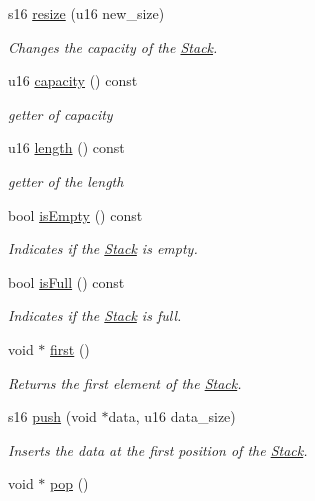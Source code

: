 \begin{DoxyCompactItemize}
s16 \hyperlink{class_stack_ae210ae6778f978313659fbd7aa59fc6c}{resize} (u16 new\+\_\+size)
\begin{DoxyCompactList}\small\item\em Changes the capacity of the \hyperlink{class_stack}{Stack}. \end{DoxyCompactList}\item 
u16 \hyperlink{class_stack_a3bb579836ffee2ddc1eb7cb0bfa02b43}{capacity} () const
\begin{DoxyCompactList}\small\item\em getter of capacity \end{DoxyCompactList}\item 
u16 \hyperlink{class_stack_af1b623c6719cf5d7ef22a73117fcd88f}{length} () const
\begin{DoxyCompactList}\small\item\em getter of the length \end{DoxyCompactList}\item 
bool \hyperlink{class_stack_a8b137edba711ed0250dccf9ecdd52971}{is\+Empty} () const
\begin{DoxyCompactList}\small\item\em Indicates if the \hyperlink{class_stack}{Stack} is empty. \end{DoxyCompactList}\item 
bool \hyperlink{class_stack_a1b7baacfc1eabbb0554852a4ea02618d}{is\+Full} () const
\begin{DoxyCompactList}\small\item\em Indicates if the \hyperlink{class_stack}{Stack} is full. \end{DoxyCompactList}\item 
void $\ast$ \hyperlink{class_stack_a32a58607561bad2f48e3af293027412c}{first} ()
\begin{DoxyCompactList}\small\item\em Returns the first element of the \hyperlink{class_stack}{Stack}. \end{DoxyCompactList}\item 
s16 \hyperlink{class_stack_ace717fade5bd0d805231aa934bb04299}{push} (void $\ast$data, u16 data\+\_\+size)
\begin{DoxyCompactList}\small\item\em Inserts the data at the first position of the \hyperlink{class_stack}{Stack}. \end{DoxyCompactList}\item 
void $\ast$ \hyperlink{class_stack_a3d88defdf19383864b519080c02c9f16}{pop} ()

\end{DoxyCompactItemize}
